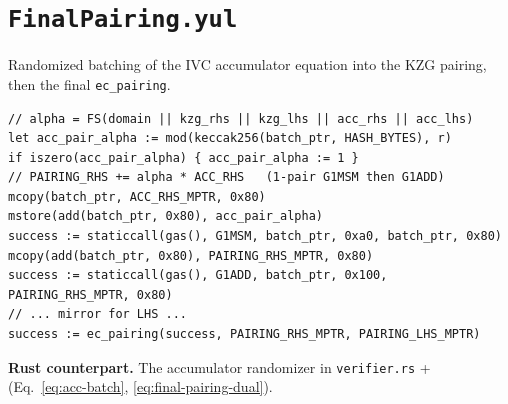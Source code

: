 \section{\texttt{FinalPairing.yul}}
\label{sec:finalpairing-audit}

Randomized batching of the IVC accumulator equation into the KZG pairing,
then the final \texttt{ec\_pairing}.

\begin{lstlisting}[style=yul]
// alpha = FS(domain || kzg_rhs || kzg_lhs || acc_rhs || acc_lhs)
let acc_pair_alpha := mod(keccak256(batch_ptr, HASH_BYTES), r)
if iszero(acc_pair_alpha) { acc_pair_alpha := 1 }
// PAIRING_RHS += alpha * ACC_RHS   (1-pair G1MSM then G1ADD)
mcopy(batch_ptr, ACC_RHS_MPTR, 0x80)
mstore(add(batch_ptr, 0x80), acc_pair_alpha)
success := staticcall(gas(), G1MSM, batch_ptr, 0xa0, batch_ptr, 0x80)
mcopy(add(batch_ptr, 0x80), PAIRING_RHS_MPTR, 0x80)
success := staticcall(gas(), G1ADD, batch_ptr, 0x100, PAIRING_RHS_MPTR, 0x80)
// ... mirror for LHS ...
success := ec_pairing(success, PAIRING_RHS_MPTR, PAIRING_LHS_MPTR)
\end{lstlisting}

\textbf{Rust counterpart.} The accumulator randomizer in
\texttt{verifier.rs} + 
(Eq.~\eqref{eq:acc-batch}, \eqref{eq:final-pairing-dual}).

